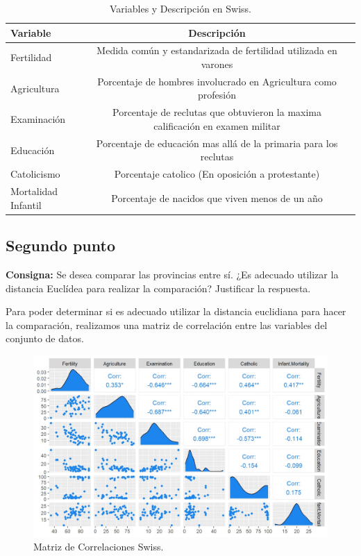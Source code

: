 \documentclass{article} %
\begin{document}
\begin{table}[H]
	\centering
		\begin{tabular}{||l || c | c ||}
			\hline
			\hline
			Variable & Descripción\\
			\hline			
			\hline
			Fertilidad &  Medida común y estandarizada de fertilidad utilizada en varones \\
			\hline
			Agricultura & Porcentaje de hombres involucrado en Agricultura como profesión \\
			\hline
			Examinación & Porcentaje de reclutas que obtuvieron la maxima calificación en examen militar \\
			\hline
			Educación & Porcentaje de educación mas allá de la primaria para los reclutas \\
			\hline
			Catolicismo & Porcentaje catolico (En oposición a protestante) \\
			\hline
			Mortalidad Infantil & Porcentaje de nacidos que viven menos de un año \\
			\hline
			\hline
		\end{tabular}
		\caption{Variables y Descripción en Swiss.}
	\label{tab:table-punto-2-4}
\end{table}

\subsection{Segundo punto}

\textbf{Consigna:} Se desea comparar las provincias entre sí. ¿Es adecuado utilizar la distancia Euclídea para realizar la comparación? Justificar la respuesta.

Para poder determinar si es adecuado utilizar la distancia euclidiana para hacer la comparación, realizamos una matriz de correlación entre las variables del conjunto de datos.

\begin{figure}[H]
	\centering
	\includegraphics[width=1\textwidth]{images/3-2 corr}
	\caption{Matriz de Correlaciones Swiss.}
	\label{fig:corr2}
\end{figure}
\end{document}
